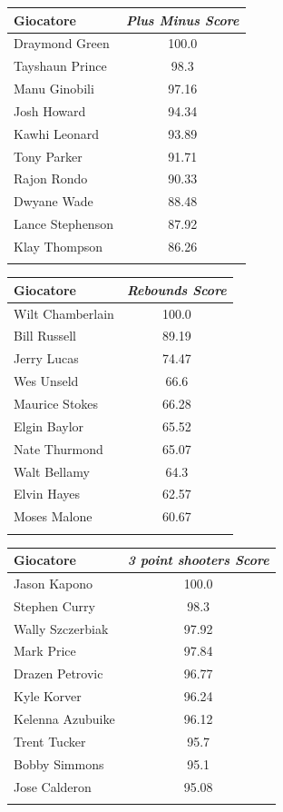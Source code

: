 \documentclass[10pt,a4paper,twocolumn]{article}
\begin{document}
\begin{table}[t]
	\parbox{.45\linewidth}{
		\begin{tabular}{lc}
			Giocatore & \textit{Plus Minus Score}  \\
			\hline
			Draymond Green & 100.0\\
			Tayshaun Prince & 98.3\\
			Manu Ginobili & 97.16\\
			Josh Howard & 94.34\\
			Kawhi Leonard & 93.89\\
			Tony Parker & 91.71\\
			Rajon Rondo & 90.33\\
			Dwyane Wade & 88.48\\
			Lance Stephenson & 87.92\\
			Klay Thompson & 86.26\\
			&\\
		\end{tabular}
	}
	\quad
	\hspace{20pt}
	\parbox{.45\linewidth}{
		\begin{tabular}{lc}
			Giocatore & \textit{Rebounds Score}  \\
			\hline
			Wilt Chamberlain & 100.0\\
			Bill Russell & 89.19\\
			Jerry Lucas & 74.47\\
			Wes Unseld & 66.6\\
			Maurice Stokes & 66.28\\
			Elgin Baylor & 65.52\\
			Nate Thurmond & 65.07\\
			Walt Bellamy & 64.3\\
			Elvin Hayes & 62.57\\
			Moses Malone & 60.67\\
			&\\
			
		\end{tabular}
	}
	
	
	\parbox{.45\linewidth}{
		\begin{tabular}{lc}
			Giocatore & \textit{3 point shooters Score}  \\
			\hline
			Jason Kapono & 100.0\\
			Stephen Curry & 98.3\\
			Wally Szczerbiak & 97.92\\
			Mark Price & 97.84\\
			Drazen Petrovic & 96.77\\
			Kyle Korver & 96.24\\
			Kelenna Azubuike & 96.12\\
			Trent Tucker & 95.7\\
			Bobby Simmons & 95.1\\
			Jose Calderon & 95.08\\
			&\\
			

\end{tabular}}
\end{table}
\end{document}
